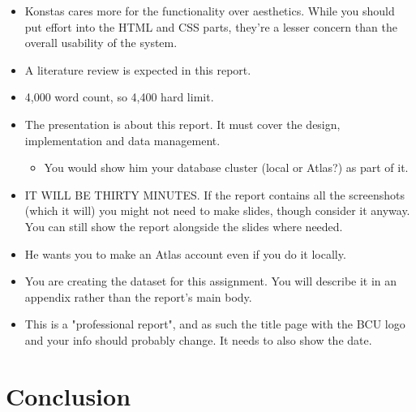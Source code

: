 \documentclass[12pt]{report}
\begin{document}
\begin{itemize}
    \item Konstas cares more for the functionality over aesthetics. While you should put effort into 
    the HTML and CSS parts, they're a lesser concern than the overall usability of the system.
    \item A literature review is expected in this report.
    \item 4,000 word count, so 4,400 hard limit.
    \item The presentation is about this report. It must cover the design, implementation and data management.
    \begin{itemize}
        \item You would show him your database cluster (local or Atlas?) as part of it.
    \end{itemize}
    \item IT WILL BE THIRTY MINUTES. If the report contains all the screenshots (which it will) you might not need 
    to make slides, though consider it anyway. You can still show the report alongside the slides where needed.
    \item He wants you to make an Atlas account even if you do it locally.
    \item You are creating the dataset for this assignment. You will describe it in an appendix rather than 
    the report's main body.
    \item This is a "professional report", and as such the title page with the BCU logo and your info should 
    probably change. It needs to also show the date.
\end{itemize}

















\chapter*{Conclusion}
\end{document}
